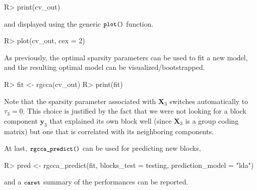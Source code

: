 \documentclass[
]{jss}
\begin{document}
\footnotesize

\begin{CodeChunk}
\begin{CodeInput}
R> print(cv_out)
\end{CodeInput}
\end{CodeChunk}

\normalsize

and displayed using the generic \(\small{\texttt{plot()}}\) function.

\footnotesize

\begin{CodeChunk}
\begin{CodeInput}
R> plot(cv_out, cex = 2)
\end{CodeInput}
\end{CodeChunk}

\normalsize

As previously, the optimal sparsity parameters can be used to fit a new
model, and the resulting optimal model can be visualized/bootstrapped.

\footnotesize

\begin{CodeChunk}
\begin{CodeInput}
R> fit <- rgcca(cv_out)
R> print(fit)
\end{CodeInput}
\end{CodeChunk}

\normalsize

Note that the sparsity parameter associated with \(\mathbf{X}_3\)
switches automatically to \(\tau_3 = 0\). This choice is justified by
the fact that we were not looking for a block component \(\mathbf y_3\)
that explained its own block well (since \(\mathbf{X}_3\) is a group
coding matrix) but one that is correlated with its neighboring
components.

At last, \(\small{\texttt{rgcca\_predict()}}\) can be used for
predicting new blocks,

\footnotesize

\begin{CodeChunk}
\begin{CodeInput}
R> pred <- rgcca_predict(fit, blocks_test = testing, prediction_model = "lda")
\end{CodeInput}
\end{CodeChunk}

\normalsize

and a \(\small{\texttt{caret}}\) summary of the performances can be
reported.
\end{document}
